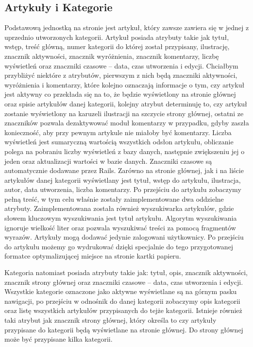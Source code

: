 \documentclass[openright]{xmgr}
\begin{document}
\subsection{Artykuły i Kategorie}
Podstawową jednostką na stronie jest artykuł, który zawsze zawiera się w jednej z uprzednio utworzonych kategorii. Artykuł posiada atrybuty takie jak tytuł, wstęp, treść główną, numer kategorii do której został przypisany, ilustrację, znacznik aktywności, znacznik wyróżnienia, znacznik komentarzy, liczbę wyświetleń oraz znaczniki czasowe – data, czas utworzenia i edycji. Chciałbym przybliżyć niektóre z atrybutów, pierwszym z nich będą znaczniki aktywności, wyróżnienia i komentarzy, które kolejno oznaczają informacje o tym, czy artykuł jest aktywny co przekłada się na to, że będzie wyświetlony na stronie głównej oraz spisie artykułów danej kategorii, kolejny atrybut determinuję to, czy artykuł zostanie wyświetlony na karuzeli ilustracji na szczycie strony głównej, ostatni ze znaczników pozwala dezaktywować moduł komentarzy w przypadku, gdyby zaszła konieczność, aby przy pewnym artykule nie miałoby być komentarzy. Liczba wyświetleń jest sumaryczną wartością wszystkich odsłon artykułu, obliczanie polega na pobraniu liczby wyświetleń z bazy danych, następnie zwiększeniu jej o jeden oraz aktualizacji wartości w bazie danych. Znaczniki czasowe są automatycznie dodawane przez Rails. Zarówno na stronie głównej, jak i na liście artykułów danej kategorii wyświetlany jest tytuł, wstęp do artykułu, ilustracja, autor, data utworzenia, liczba komentarzy. Po przejściu do artykułu zobaczymy pełną treść, w tym celu właśnie zostały zaimplementowane dwa oddzielne atrybuty. Zaimplementowana została również wyszukiwarka artykułów, gdzie słowem kluczowym wyszukiwania jest tytuł artykułu. Algorytm wyszukiwania ignoruje wielkość liter oraz pozwala wyszukiwać treści za pomocą fragmentów wyrazów. Artykuły mogą dodawać jedynie zalogowani użytkownicy. Po przejściu do artykułu możemy go wydrukować dzięki specjalnie do tego przygotowanej formatce optymalizującej miejsce na stronie kartki papieru.

Kategoria natomiast posiada atrybuty takie jak: tytuł, opis, znacznik aktywności, znacznik strony głównej oraz znaczniki czasowe – data, czas utworzenia i edycji. Wszystkie kategorie oznaczone jako aktywne wyświetlane są na górnym pasku nawigacji, po przejściu w odnośnik do danej kategorii zobaczymy opis kategorii oraz listę wszystkich artykułów przypisanych do tejże kategorii. Istnieje również taki atrybut jak znacznik strony głównej, który określa to czy artykuły przypisane do kategorii będą wyświetlane na stronie głównej. Do strony głównej może być przypisane kilka kategorii.
\end{document}

